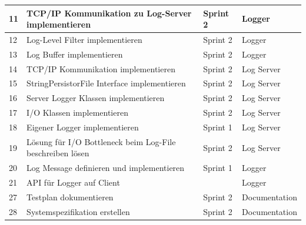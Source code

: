 \documentclass[11pt]{article}
\begin{document}
\begin{table}[!h]
{\begin{tabular}{@{}llll@{}}
			\multicolumn{1}{|l|}{11} & \multicolumn{1}{l|}{TCP/IP Kommunikation zu Log-Server implementieren}         & \multicolumn{1}{l|}{Sprint 2}                      & \multicolumn{1}{l|}{Logger}       \\ \midrule
			\multicolumn{1}{|l|}{12} & \multicolumn{1}{l|}{Log-Level Filter implementieren}                           & \multicolumn{1}{l|}{Sprint 2}                      & \multicolumn{1}{l|}{Logger}       \\ \midrule
			\multicolumn{1}{|l|}{13} & \multicolumn{1}{l|}{Log Buffer implementieren}                                 & \multicolumn{1}{l|}{Sprint 2}                      & \multicolumn{1}{l|}{Logger}       \\ \midrule
			\multicolumn{1}{|l|}{14} & \multicolumn{1}{l|}{TCP/IP Kommunikation implementieren}                       & \multicolumn{1}{l|}{Sprint 2}                      & \multicolumn{1}{l|}{Log Server}   \\ \midrule
			\multicolumn{1}{|l|}{15} & \multicolumn{1}{l|}{StringPersistorFile Interface implementieren}              & \multicolumn{1}{l|}{Sprint 2}                      & \multicolumn{1}{l|}{Log Server}   \\ \midrule
			\multicolumn{1}{|l|}{16} & \multicolumn{1}{l|}{Server Logger Klassen implementieren}                      & \multicolumn{1}{l|}{Sprint 2}                      & \multicolumn{1}{l|}{Log Server}   \\ \midrule
			\multicolumn{1}{|l|}{17} & \multicolumn{1}{l|}{I/O Klassen implementieren}                                & \multicolumn{1}{l|}{Sprint 2}                      & \multicolumn{1}{l|}{Log Server}   \\ \midrule
			\multicolumn{1}{|l|}{18} & \multicolumn{1}{l|}{Eigener Logger implementieren}                             & \multicolumn{1}{l|}{Sprint 1}                      & \multicolumn{1}{l|}{Log Server}   \\ \midrule
			\multicolumn{1}{|l|}{19} & \multicolumn{1}{l|}{Lösung für I/O Bottleneck beim Log-File beschreiben lösen} & \multicolumn{1}{l|}{Sprint 2}                      & \multicolumn{1}{l|}{Log Server}   \\ \midrule
			\multicolumn{1}{|l|}{20} & \multicolumn{1}{l|}{Log Message definieren und implementieren}          & \multicolumn{1}{l|}{Sprint 1}                      & \multicolumn{1}{l|}{Logger}       \\ \midrule
			\multicolumn{1}{|l|}{21} & \multicolumn{1}{l|}{API für Logger auf Client}                                 & \multicolumn{1}{l|}{}                      & \multicolumn{1}{l|}{Logger}       \\ \midrule
			\multicolumn{1}{|l|}{27} & \multicolumn{1}{l|}{Testplan dokumentieren}                                 & \multicolumn{1}{l|}{Sprint 2}                      & \multicolumn{1}{l|}{Documentation}       \\ \midrule
			\multicolumn{1}{|l|}{28} & \multicolumn{1}{l|}{Systemspezifikation erstellen}                                 & \multicolumn{1}{l|}{Sprint 2}                      & \multicolumn{1}{l|}{Documentation}       \\ \bottomrule
			

\end{tabular}}
\end{table}
\end{document}
